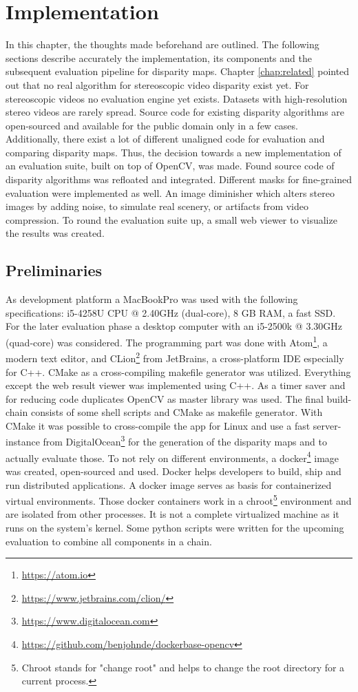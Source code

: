 \chapter{Implementation}
\label{chap:impl}

In this chapter, the thoughts made beforehand are outlined.
The following sections describe accurately the implementation, its components and the subsequent evaluation pipeline for disparity maps.
Chapter \ref{chap:related} pointed out that no real algorithm for stereoscopic video disparity exist yet.
For stereoscopic videos no evaluation engine yet exists.
Datasets with high-resolution stereo videos are rarely spread.
Source code for existing disparity algorithms are open-sourced and available for the public domain only in a few cases.
Additionally, there exist a lot of different unaligned code for evaluation and comparing disparity maps.
Thus, the decision towards a new implementation of an evaluation suite, built on top of OpenCV, was made.
Found source code of disparity algorithms was refloated and integrated.
Different masks for fine-grained evaluation were implemented as well.
An image diminisher which alters stereo images by adding noise, to simulate real scenery, or artifacts from video compression.
To round the evaluation suite up, a small web viewer to visualize the results was created.

\section{Preliminaries}

As development platform a MacBookPro was used with the following specifications: i5-4258U CPU @ 2.40GHz (dual-core), 8 GB RAM, a fast SSD.
For the later evaluation phase a desktop computer with an i5-2500k @ 3.30GHz (quad-core) was considered.
The programming part was done with Atom\footnote{\url{https://atom.io}}, a modern text editor, and CLion\footnote{\url{https://www.jetbrains.com/clion/}} from JetBrains, a cross-platform IDE especially for C++.
CMake as a cross-compiling makefile generator was utilized.
Everything except the web result viewer was implemented using C++.
As a timer saver and for reducing code duplicates OpenCV as master library was used.
The final build-chain consists of some shell scripts and CMake as makefile generator.
With CMake it was possible to cross-compile the app for Linux and use a fast server-instance from DigitalOcean\footnote{\url{https://www.digitalocean.com}} for the generation of the disparity maps and to actually evaluate those.
To not rely on different environments, a docker\footnote{\url{https://github.com/benjohnde/dockerbase-opencv}} image was created, open-sourced and used.
Docker helps developers to build, ship and run distributed applications.
A docker image serves as basis for containerized virtual environments.
Those docker containers work in a chroot\footnote{Chroot stands for "change root" and helps to change the root directory for a current process.} environment and are isolated from other processes.
It is not a complete virtualized machine as it runs on the system's kernel.
Some python scripts were written for the upcoming evaluation to combine all components in a chain.

